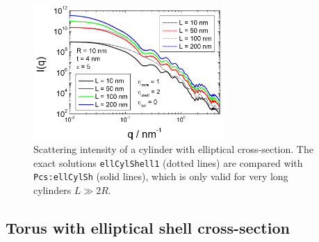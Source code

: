 \begin{figure}[htb]
\begin{center}
\includegraphics[width=0.65\textwidth,height=0.5\textwidth]{../images/form_factor/cylindrical_obj/Pcs_ellCylShell.png}
\end{center}
\caption{Scattering intensity of a cylinder with elliptical cross-section.
The exact solutions \texttt{ellCylShell1} (dotted lines) are compared
with \texttt{Pcs:ellCylSh} (solid lines), which is only valid for very long cylinders $L \gg 2R$. }
\label{fig:Pcs_ellCylShell}
\end{figure}


\newpage



\subsection{Torus with elliptical shell cross-section \cite{Kawaguchi2001,Forster1999}}
\label{sect:Torus}
\hspace{1pt}\\

